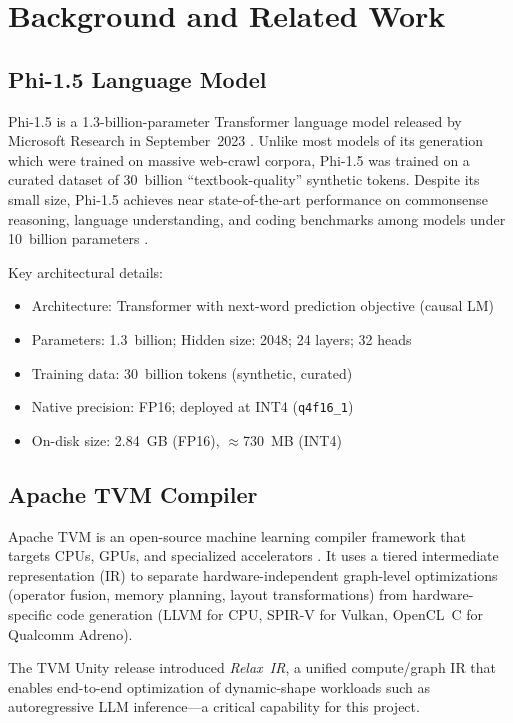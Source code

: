 \documentclass[12pt,letterpaper]{article}
\begin{document}
\section{Background and Related Work}

\subsection{Phi-1.5 Language Model}

Phi-1.5 is a 1.3-billion-parameter Transformer language model released by
Microsoft Research in September~2023 \cite{phi15paper}.
Unlike most models of its generation which were trained on massive web-crawl
corpora, Phi-1.5 was trained on a curated dataset of 30~billion
``textbook-quality'' synthetic tokens.
Despite its small size, Phi-1.5 achieves near state-of-the-art performance on
commonsense reasoning, language understanding, and coding benchmarks among models
under 10~billion parameters \cite{phi15paper}.

Key architectural details:
\begin{itemize}[noitemsep]
    \item Architecture: Transformer with next-word prediction objective (causal LM)
    \item Parameters: 1.3~billion; Hidden size: 2048; 24 layers; 32 heads
    \item Training data: 30~billion tokens (synthetic, curated)
    \item Native precision: FP16; deployed at INT4 (\texttt{q4f16\_1})
    \item On-disk size: 2.84~GB (FP16), $\approx$730~MB (INT4)
\end{itemize}

\subsection{Apache TVM Compiler}

Apache TVM is an open-source machine learning compiler framework that targets
CPUs, GPUs, and specialized accelerators \cite{tvm}.
It uses a tiered intermediate representation (IR) to separate
hardware-independent graph-level optimizations (operator fusion, memory planning,
layout transformations) from hardware-specific code generation
(LLVM for CPU, SPIR-V for Vulkan, OpenCL~C for Qualcomm Adreno).

The TVM Unity release introduced \textit{Relax~IR}, a unified compute/graph IR
that enables end-to-end optimization of dynamic-shape workloads such as
autoregressive LLM inference---a critical capability for this project.
\end{document}
